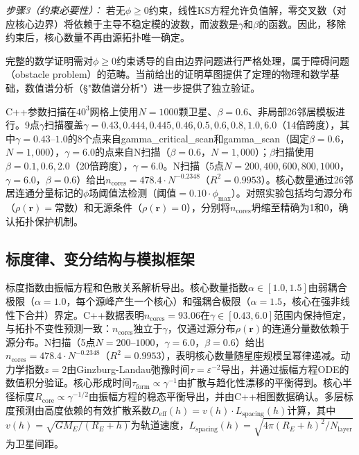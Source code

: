 \documentclass[sn-nature,pdflatex]{sn-jnl}
\begin{document}
\textit{步骤3（约束必要性）：} 若无$\phi \ge 0$约束，线性KS方程允许负值解，零交叉数（对应核心边界）将依赖于主导不稳定模的波数，而波数是$\gamma$和$\beta$的函数。因此，移除约束后，核心数量不再由源拓扑唯一确定。

完整的数学证明需对$\phi \ge 0$约束诱导的自由边界问题进行严格处理，属于障碍问题（obstacle problem）的范畴。当前给出的证明草图提供了定理的物理和数学基础，数值谱分析（§"数值谱分析"）进一步提供了独立验证。

C++参数扫描在$40^3$网格上使用$N=1000$颗卫星、$\beta=0.6$、非局部26邻居模板进行。9点$\gamma$扫描覆盖$\gamma = 0.43, 0.444, 0.445, 0.46, 0.5, 0.6, 0.8, 1.0, 6.0$（14倍跨度），其中$\gamma=0.43$--$1.0$的8个点来自gamma\_critical\_scan和gamma\_scan（固定$\beta=0.6$，$N=1,000$），$\gamma=6.0$的点来自N扫描（$\beta=0.6$，$N=1,000$）；$\beta$扫描使用$\beta = 0.1, 0.6, 2.0$（20倍跨度），$\gamma = 6.0$。N扫描（5点$N=200, 400, 600, 800, 1000$，$\gamma=6.0$，$\beta=0.6$）给出$n_{\text{cores}} = 478.4 \cdot N^{-0.2348}$（$R^2=0.9953$）。核心数量通过26邻居连通分量标记的$\phi$场阈值法检测（阈值$=0.10 \cdot \phi_{\max}$）。对照实验包括均匀源分布（$\rho(\mathbf{r}) = \text{常数}$）和无源条件（$\rho(\mathbf{r}) = 0$），分别将$n_{\text{cores}}$坍缩至精确为1和0，确认拓扑保护机制。

\subsection{标度律、变分结构与模拟框架}

标度指数由振幅方程和色散关系解析导出。核心数量指数$\alpha \in [1.0, 1.5]$由弱耦合极限（$\alpha = 1.0$，每个源峰产生一个核心）和强耦合极限（$\alpha = 1.5$，核心在强非线性下合并）界定。C++数据表明$n_{\text{cores}} = 93.06$在$\gamma \in [0.43, 6.0]$范围内保持恒定，与拓扑不变性预测一致：$n_{\text{cores}}$独立于$\gamma$，仅通过源分布$\rho(\mathbf{r})$的连通分量数依赖于源分布。N扫描（5点$N=200$--$1000$，$\gamma=6.0$，$\beta=0.6$）给出$n_{\text{cores}} = 478.4 \cdot N^{-0.2348}$（$R^2=0.9953$），表明核心数量随星座规模呈幂律递减。动力学指数$z = 2$由Ginzburg-Landau弛豫时间$\tau = \varepsilon^{-2}$导出，并通过振幅方程ODE的数值积分验证。核心形成时间$\tau_{\text{form}} \propto \gamma^{-1}$由扩散与趋化性漂移的平衡得到。核心半径标度$R_{\text{core}} \propto \gamma^{-1/2}$由振幅方程的稳态平衡导出，并由C++相图数据确认。多层标度预测由高度依赖的有效扩散系数$D_{\text{eff}}(h) = v(h) \cdot L_{\text{spacing}}(h)$计算，其中$v(h) = \sqrt{GM_E/(R_E + h)}$为轨道速度，$L_{\text{spacing}}(h) = \sqrt{4\pi(R_E + h)^2 / N_{\text{layer}}}$为卫星间距。
\end{document}
